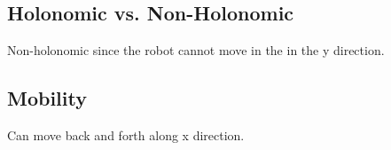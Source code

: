 \subsection{Holonomic vs. Non-Holonomic}
Non-holonomic since the robot cannot move in the in the y direction. 

\subsection{Mobility}
Can move back and forth along x direction. 